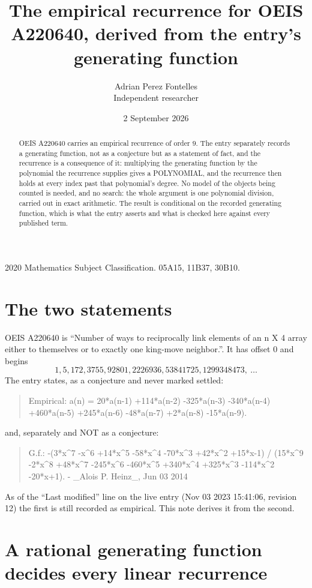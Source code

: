 \documentclass[11pt,a4paper]{article}
\title{The empirical recurrence for OEIS A220640, derived from the entry's generating function}
\author{Adrian Perez Fontelles\\ \small Independent researcher}
\date{2 September 2026}
\theoremstyle{plain}
\theoremstyle{definition}
\begin{document}
\maketitle

\begin{abstract}
OEIS A220640 carries an empirical recurrence of order $9$. The entry separately records a
generating function, not as a conjecture but as a statement of fact, and the recurrence is a
consequence of it: multiplying the generating function by the polynomial the recurrence
supplies gives a POLYNOMIAL, and the recurrence then holds at every index past that
polynomial's degree. No model of the objects being counted is needed, and no search: the
whole argument is one polynomial division, carried out in exact arithmetic. The result is
conditional on the recorded generating function, which is what the entry asserts and what is
checked here against every published term.
\end{abstract}

\noindent\small 2020 Mathematics Subject Classification. 05A15, 11B37, 30B10.\normalsize

\section{The two statements}

OEIS A220640 is ``Number of ways to reciprocally link elements of an n X 4 array either to themselves or to exactly one king-move neighbor.''. It has offset $0$ and begins
\[
1, 5, 172, 3755, 92801, 2226936, 53841725, 1299348473,\ \dots
\]
The entry states, as a conjecture and never marked settled:
\begin{quote}
Empirical: a(n) = 20*a(n-1) +114*a(n-2) -325*a(n-3) -340*a(n-4) +460*a(n-5) +245*a(n-6) -48*a(n-7) +2*a(n-8) -15*a(n-9).
\end{quote}
and, separately and NOT as a conjecture:
\begin{quote}
G.f.: -(3*x\^{}7 -x\^{}6 +14*x\^{}5 -58*x\^{}4 -70*x\^{}3 +42*x\^{}2 +15*x-1) / (15*x\^{}9 -2*x\^{}8 +48*x\^{}7 -245*x\^{}6 -460*x\^{}5 +340*x\^{}4 +325*x\^{}3 -114*x\^{}2 -20*x+1). - \_Alois P. Heinz\_, Jun 03 2014
\end{quote}
As of the ``Last modified'' line on the live entry (Nov 03 2023 15:41:06, revision 12) the first is still
recorded as empirical. This note derives it from the second.

\section{A rational generating function decides every linear recurrence}
\end{document}
